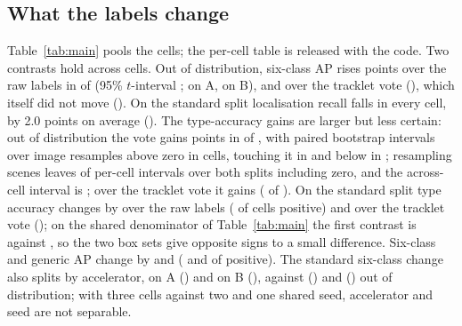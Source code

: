 \documentclass{article}
\begin{document}
\subsection{What the labels change}
Table~\ref{tab:main} pools the cells; the per-cell table is released with the code. Two contrasts hold across cells. Out of distribution, six-class AP rises \SvSixOODVsRawGain{} points over the raw labels in \SvSixOODVsRawPos{} of \SvCells{} (95\% $t$-interval \SvSixOODVsRawCI; \SvOODGainA{} on A, \SvOODGainB{} on B), and \SvSixOODVsTrkGain{} over the tracklet vote (\SvSixOODVsTrkCI), which itself did not move (\SvSixOODTrkVsRawGain). On the standard split localisation recall falls in every cell, by 2.0 points on average (\SvRecStdVsRawCI). The type-accuracy gains are larger but less certain: out of distribution the vote gains \SvTypeOODVsRawGain{} points in \SvTypeOODVsRawPos{} of \SvCells, with paired bootstrap intervals over \SvBootDraws{} image resamples above zero in \SvOODAbove{} cells, touching it in \SvOODStraddle{} and below in \SvOODBelow{}; resampling scenes leaves \SceneBootZero{} of \SceneBootCells{} per-cell intervals over both splits including zero, and the across-cell interval is \SvTypeOODVsRawCI; over the tracklet vote it gains \SvTypeOODVsTrkGain{} (\SvTypeOODVsTrkPos{} of \SvCells). On the standard split type accuracy changes by \SvTypeStdVsRawGain{} over the raw labels (\SvTypeStdVsRawPos{} of \SvCells{} cells positive) and \SvTypeStdVsTrkGain{} over the tracklet vote (\SvTypeStdVsTrkPos{}); on the shared denominator of Table~\ref{tab:main} the first contrast is \TblSvStdType{} against \TblRawStdType, so the two box sets give opposite signs to a small difference. Six-class and generic AP change by \SvSixStdVsRawGain{} and \SvGenStdVsRawGain{} (\SvSixStdVsRawPos{} and \SvGenStdVsRawPos{} of \SvCells{} positive). The standard six-class change also splits by accelerator, \SvStdGainA{} on A (\SvStdCIA) and \SvStdGainB{} on B (\SvStdCIB), against \SvOODGainA{} (\SvOODCIA) and \SvOODGainB{} (\SvOODCIB) out of distribution; with three cells against two and one shared seed, accelerator and seed are not separable.
\end{document}
